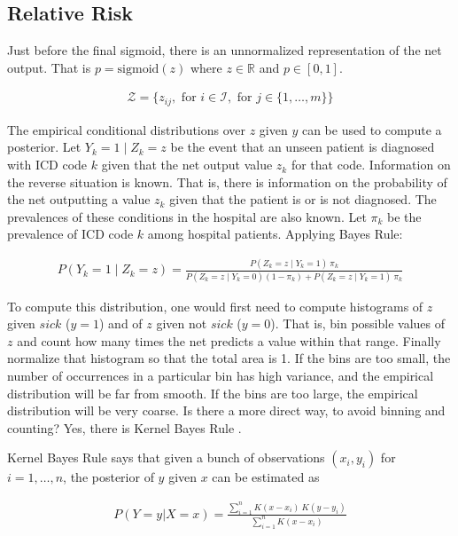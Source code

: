 \subsection{Relative Risk}

Just before the final sigmoid, there is an unnormalized representation of the net output.  That is $p = \text{sigmoid}(z)$ where $z \in \mathbb{R}$ and $p \in [0, 1]$.

\begin{gather}
    \mathcal{Z} = \{
        z_{ij},
        \text{ for } i \in \mathcal{I},
        \text{ for } j \in \{ 1, \dots, m \}
    \}
\end{gather}

The empirical conditional distributions over $z$ given $y$ can be used to compute a posterior.  Let $Y_k = 1 \mid Z_k = z$ be the event that an unseen patient is diagnosed with ICD code $k$ given that the net output value $z_k$ for that code.  Information on the reverse situation is known.  That is, there is information on the probability of the net outputting a value $z_k$ given that the patient is or is not diagnosed.  The prevalences of these conditions in the hospital are also known.  Let $\pi_k$ be the prevalence of ICD code $k$ among hospital patients.  Applying Bayes Rule:

\begin{gather}
    P(Y_k = 1 \mid Z_k = z) = \frac
        {P(Z_k = z \mid Y_k = 1) \ \pi_k}
        {P(Z_k = z \mid Y_k = 0) (1 - \pi_k) + P(Z_k = z \mid Y_k = 1) \ \pi_k}
\end{gather}

To compute this distribution, one would first need to compute histograms of $z$ given $sick$ ($y=1$) and of $z$ given not $sick$ ($y=0$).  That is, bin possible values of $z$ and count how many times the net predicts a value within that range.  Finally normalize that histogram so that the total area is 1.  If the bins are too small, the number of occurrences in a particular bin has high variance, and the empirical distribution will be far from smooth.  If the bins are too large, the empirical distribution will be very coarse.  Is there a more direct way, to avoid binning and counting?  Yes, there is Kernel Bayes Rule \cite{fukumizu2013kernel}.  

Kernel Bayes Rule says that given a bunch of observations $(x_i, y_i)$ for $i = 1, \dots, n$, the posterior of $y$ given $x$ can be estimated as

\begin{gather}
    P(Y = y | X = x) = \frac
        {\sum_{i=1}^n K(x - x_i) \ K(y - y_i)}
        {\sum_{i=1}^n K(x - x_i)}
\end{gather}

